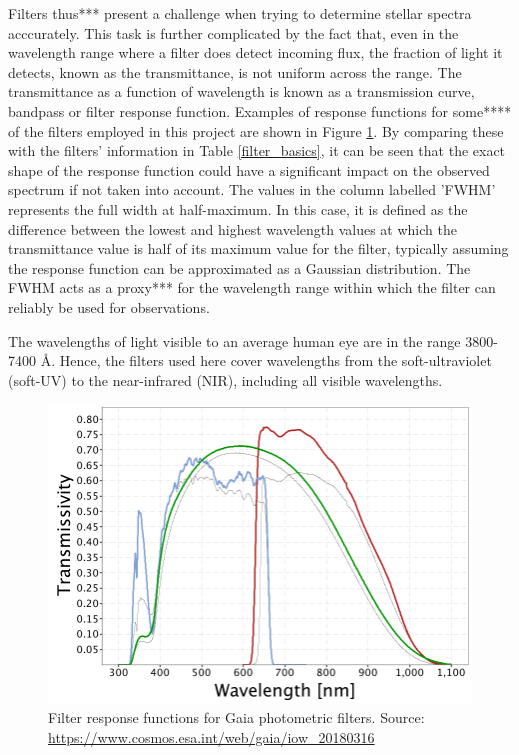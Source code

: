 \documentclass[12pt, a4paper]{report}
\begin{document}
Filters thus*** present a challenge when trying to determine stellar spectra acccurately. This task is further complicated by the fact that, even in the wavelength range where a filter does detect incoming flux, the fraction of light it detects, known as the transmittance, is not uniform across the range. The transmittance as a function of wavelength is known as a transmission curve, bandpass or filter response function. Examples of response functions for some**** of the filters employed in this project are shown in Figure \ref{ACS_response_funcs}. By comparing these with the filters' information in Table \ref{filter_basics}, it can be seen that the exact shape of the response function could have a significant impact on the observed spectrum if not taken into account.
The values in the column labelled 'FWHM' represents the full width at half-maximum. In this case, it is defined as the difference between the lowest and highest wavelength values at which the transmittance value is half of its maximum value for the filter, typically assuming the response function can be approximated as a Gaussian distribution. The FWHM acts as a proxy*** for the wavelength range within which the filter can reliably be used for observations.

The wavelengths of light visible to an average human eye are in the range 3800-7400 \AA . Hence, the filters used here cover wavelengths from the soft-ultraviolet (soft-UV) to the near-infrared (NIR),  including all visible wavelengths.

\begin{figure}[h]
\begin{center}
\includegraphics[scale=0.5]{GaiaDR2Passbands.png}
\caption{Filter response functions for Gaia photometric filters. Source: \protect\url{https://www.cosmos.esa.int/web/gaia/iow_20180316}}
\label{ACS_response_funcs}
\end{center}
\end{figure}
\end{document}
